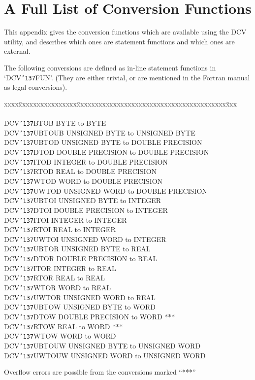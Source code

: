 \documentclass[twoside,11pt]{article}
\renewcommand{\_}{{\tt\char'137}}     %
\newcommand{\xlabel}[1]{}
\begin{document}
\section{\xlabel{ap_b}A Full List of Conversion Functions\label{ap_b}}

This appendix gives the conversion functions which are available using
the DCV utility, and describes which ones are statement functions and
which ones are external.

The following conversions are defined as in-line statement functions in 
`DCV\_FUN'. (They are either trivial, or are mentioned in the Fortran
manual as legal conversions).

\begin{tabbing}
xxxx\=xxxxxxxxxxxxxxxx\=xxxxxxxxxxxxxxxxxxxxxxxxxxxxxxxxxxxxxxxxx\=xxx\kill 
{}   \\
\\
\>DCV\_BTOB   \>BYTE to BYTE \\
\>DCV\_UBTOUB \>UNSIGNED BYTE to UNSIGNED BYTE \\
\>DCV\_UBTOD  \>UNSIGNED BYTE to DOUBLE PRECISION \\
\>DCV\_DTOD   \>DOUBLE PRECISION to DOUBLE PRECISION \\
\>DCV\_ITOD   \>INTEGER to DOUBLE PRECISION \\
\>DCV\_RTOD   \>REAL to DOUBLE PRECISION \\
\>DCV\_WTOD   \>WORD to DOUBLE PRECISION \\
\>DCV\_UWTOD  \>UNSIGNED WORD to DOUBLE PRECISION \\
\>DCV\_UBTOI  \>UNSIGNED BYTE to INTEGER \\
\>DCV\_DTOI   \>DOUBLE PRECISION to INTEGER \\
\>DCV\_ITOI   \>INTEGER to INTEGER \\
\>DCV\_RTOI   \>REAL to INTEGER \\
\>DCV\_UWTOI  \>UNSIGNED WORD to INTEGER \\
\>DCV\_UBTOR  \>UNSIGNED BYTE to REAL \\
\>DCV\_DTOR   \>DOUBLE PRECISION to REAL \\
\>DCV\_ITOR   \>INTEGER to REAL \\
\>DCV\_RTOR   \>REAL to REAL \\
\>DCV\_WTOR   \>WORD to REAL \\
\>DCV\_UWTOR  \>UNSIGNED WORD to REAL \\
\>DCV\_UBTOW  \>UNSIGNED BYTE to WORD \\
\>DCV\_DTOW   \>DOUBLE PRECISION to WORD       \>*** \\
\>DCV\_RTOW   \>REAL to WORD                   \>*** \\
\>DCV\_WTOW   \>WORD to WORD \\
\>DCV\_UBTOUW \>UNSIGNED BYTE to UNSIGNED WORD \\
\>DCV\_UWTOUW \>UNSIGNED WORD to UNSIGNED WORD \\
\end{tabbing} 
Overflow errors are possible from the conversions marked ``***''
\end{document}
